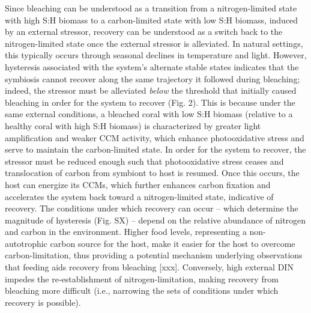 \documentclass[]{elsarticle} %
\begin{document}
Since bleaching can be understood as a transition from a
nitrogen-limited state with high S:H biomass to a carbon-limited state
with low S:H biomass, induced by an external stressor, recovery can be
understood as a switch back to the nitrogen-limited state once the
external stressor is alleviated. In natural settings, this typically
occurs through seasonal declines in temperature and light. However,
hysteresis associated with the system's alternate stable states
indicates that the symbiosis cannot recover along the same trajectory it
followed during bleaching; indeed, the stressor must be alleviated
\emph{below} the threshold that initially caused bleaching in order for
the system to recover (Fig. 2). This is because under the same external
conditions, a bleached coral with low S:H biomass (relative to a healthy
coral with high S:H biomass) is characterized by greater light
amplification and weaker CCM activity, which enhance photooxidative
stress and serve to maintain the carbon-limited state. In order for the
system to recover, the stressor must be reduced enough such that
photooxidative stress ceases and translocation of carbon from symbiont
to host is resumed. Once this occurs, the host can energize its CCMs,
which further enhances carbon fixation and accelerates the system back
toward a nitrogen-limited state, indicative of recovery. The conditions
under which recovery can occur -- which determine the magnitude of
hysteresis (Fig. SX) -- depend on the relative abundance of nitrogen and
carbon in the environment. Higher food levels, representing a
non-autotrophic carbon source for the host, make it easier for the host
to overcome carbon-limitation, thus providing a potential mechanism
underlying observations that feeding aids recovery from bleaching
{[}xxx{]}. Conversely, high external DIN impedes the re-establishment of
nitrogen-limitation, making recovery from bleaching more difficult
(i.e., narrowing the sets of conditions under which recovery is
possible).
\end{document}
